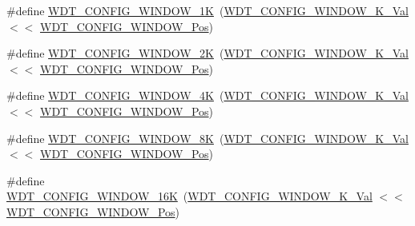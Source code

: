\begin{DoxyCompactItemize}
\#define \mbox{\hyperlink{group___s_a_m_d21___w_d_t_ga6597f7deeadccbe3a8dc7f157f361f6f}{W\+D\+T\+\_\+\+C\+O\+N\+F\+I\+G\+\_\+\+W\+I\+N\+D\+O\+W\+\_\+1K}}~(\mbox{\hyperlink{group___s_a_m_d21___w_d_t_gaf08a60bd2ff13f7304deb395c6fe437c}{W\+D\+T\+\_\+\+C\+O\+N\+F\+I\+G\+\_\+\+W\+I\+N\+D\+O\+W\+\_\+K\+\_\+\+Val}}      $<$$<$ \mbox{\hyperlink{group___s_a_m_d21___w_d_t_gab2d3263bd9ad06e3257234d9da623ef8}{W\+D\+T\+\_\+\+C\+O\+N\+F\+I\+G\+\_\+\+W\+I\+N\+D\+O\+W\+\_\+\+Pos}})
\item 
\#define \mbox{\hyperlink{group___s_a_m_d21___w_d_t_ga0bb67ea0af8bcd3e226dd9453914eacc}{W\+D\+T\+\_\+\+C\+O\+N\+F\+I\+G\+\_\+\+W\+I\+N\+D\+O\+W\+\_\+2K}}~(\mbox{\hyperlink{group___s_a_m_d21___w_d_t_ga4ebc9af4aeb8b0095afa2b837ec3dbc7}{W\+D\+T\+\_\+\+C\+O\+N\+F\+I\+G\+\_\+\+W\+I\+N\+D\+O\+W\+\_\+K\+\_\+\+Val}}      $<$$<$ \mbox{\hyperlink{group___s_a_m_d21___w_d_t_gab2d3263bd9ad06e3257234d9da623ef8}{W\+D\+T\+\_\+\+C\+O\+N\+F\+I\+G\+\_\+\+W\+I\+N\+D\+O\+W\+\_\+\+Pos}})
\item 
\#define \mbox{\hyperlink{group___s_a_m_d21___w_d_t_ga06bf05e982ad42dba9a1ea3fc37dfd6c}{W\+D\+T\+\_\+\+C\+O\+N\+F\+I\+G\+\_\+\+W\+I\+N\+D\+O\+W\+\_\+4K}}~(\mbox{\hyperlink{group___s_a_m_d21___w_d_t_ga86b3919f592e4ea3dd1f74e0ef2ce2fa}{W\+D\+T\+\_\+\+C\+O\+N\+F\+I\+G\+\_\+\+W\+I\+N\+D\+O\+W\+\_\+K\+\_\+\+Val}}      $<$$<$ \mbox{\hyperlink{group___s_a_m_d21___w_d_t_gab2d3263bd9ad06e3257234d9da623ef8}{W\+D\+T\+\_\+\+C\+O\+N\+F\+I\+G\+\_\+\+W\+I\+N\+D\+O\+W\+\_\+\+Pos}})
\item 
\#define \mbox{\hyperlink{group___s_a_m_d21___w_d_t_gae4a3358615c78f14f7f1b4af97d016ea}{W\+D\+T\+\_\+\+C\+O\+N\+F\+I\+G\+\_\+\+W\+I\+N\+D\+O\+W\+\_\+8K}}~(\mbox{\hyperlink{group___s_a_m_d21___w_d_t_gab9665c8a40f0898e8971b44efe68c5b2}{W\+D\+T\+\_\+\+C\+O\+N\+F\+I\+G\+\_\+\+W\+I\+N\+D\+O\+W\+\_\+K\+\_\+\+Val}}      $<$$<$ \mbox{\hyperlink{group___s_a_m_d21___w_d_t_gab2d3263bd9ad06e3257234d9da623ef8}{W\+D\+T\+\_\+\+C\+O\+N\+F\+I\+G\+\_\+\+W\+I\+N\+D\+O\+W\+\_\+\+Pos}})
\item 
\#define \mbox{\hyperlink{group___s_a_m_d21___w_d_t_ga29e680cdbd758500b129cefc8eed6861}{W\+D\+T\+\_\+\+C\+O\+N\+F\+I\+G\+\_\+\+W\+I\+N\+D\+O\+W\+\_\+16K}}~(\mbox{\hyperlink{group___s_a_m_d21___w_d_t_ga5a8497f7d23067463f32265143a47eeb}{W\+D\+T\+\_\+\+C\+O\+N\+F\+I\+G\+\_\+\+W\+I\+N\+D\+O\+W\+\_\+K\+\_\+\+Val}}     $<$$<$ \mbox{\hyperlink{group___s_a_m_d21___w_d_t_gab2d3263bd9ad06e3257234d9da623ef8}{W\+D\+T\+\_\+\+C\+O\+N\+F\+I\+G\+\_\+\+W\+I\+N\+D\+O\+W\+\_\+\+Pos}})
\item 
$$
\end{DoxyCompactItemize}
